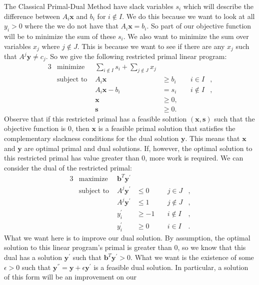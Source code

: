 \documentclass[11pt]{article}
\renewcommand{\'}{^{'}}
\begin{document}
\begin{section}{The Classical Primal-Dual Method}
	have slack variables $s_i$ which will describe the difference between $A_i\mathbf{x}$ and $b_i$ 
	for $i\notin I$. We do this because we want to look at all $y_i > 0$ where the we do not 
	have that $A_i\mathbf{x} = b_i$. So part of our objective function will be to minimize the 
	sum of these $s_i$. We also want to minimize the sum over variables $x_j$ where $j\notin J$. 
	This is because we want to see if there are any $x_j$ such that $A^{j}\mathbf{y} \neq c_j$. 
	So we give the following restricted primal linear program:
	\begin{alignat}{3}
		& \text{minimize } & \sum_{i\notin I} s_i + \sum_{j\notin J} x_j & \\
		& \text{subject to } & A_i\mathbf{x} & \geq b_i & \quad i\in I &, \\
				     && A_i\mathbf{x} - b_i & = s_i & \quad i\notin I &, \\
				     && \mathbf{x} & \geq 0, \\
				     && \mathbf{s} & \geq 0.
	\end{alignat}
	Observe that if this restricted primal has a feasible solution $(\mathbf{x},\mathbf{s})$ such 
	that the objective function is 0, then $\mathbf{x}$ is a feasible primal solution that 
	satisfies the complementary slackness conditions for the dual solution $\mathbf{y}$. This 
	means that $\mathbf{x}$ and $\mathbf{y}$ are optimal primal and dual solutions. If, however, 
	the optimal solution to this restricted primal has value greater than 0, more work is required. 
	We can consider the dual of the restricted primal:
	\begin{alignat}{3}
		& \text{maximize } & \mathbf{b}^{T}\mathbf{y}\' & \\
		& \text{subject to } & A^{j}\mathbf{y}\' & \leq 0 & \quad j\in J &, \\
				     && A^{j}\mathbf{y}\' & \leq 1 & \quad j\notin J &, \\
				     && y_i\' & \geq -1 & \quad i\notin I &, \\
				     && y_i\' & \geq 0 & \quad i\in I &.
	\end{alignat}
	What we want here is to improve our dual solution. By assumption, the optimal solution to this 
	linear program's primal is greater than 0, so we know that this dual has a solution 
	$\mathbf{y}\'$ such that $\mathbf{b}^{T}\mathbf{y}\' > 0$. What we want is the existence of 
	some $\epsilon > 0$ such that $\mathbf{y}^{''} = \mathbf{y} + \epsilon \mathbf{y}\'$ is a 
	feasible dual solution. In particular, a solution of this form will be an improvement on our 

\end{section}
\end{document}
